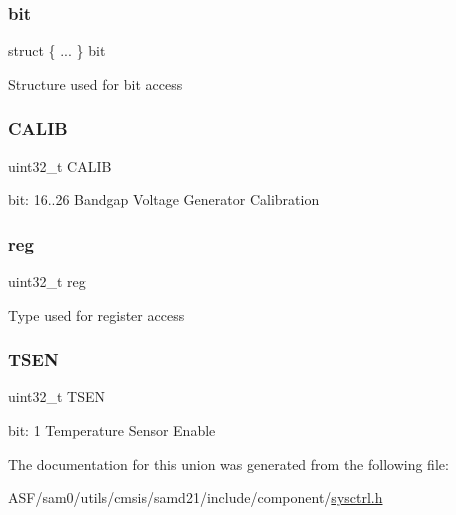 \subsubsection{\texorpdfstring{bit}{bit}}
{\footnotesize\ttfamily struct \{ ... \}   bit}

Structure used for bit access \mbox{\label{union_s_y_s_c_t_r_l___v_r_e_f___type_a95f06de3371ee421b89d4be2aae51561}} 
\subsubsection{\texorpdfstring{CALIB}{CALIB}}
{\footnotesize\ttfamily uint32\+\_\+t C\+A\+L\+IB}

bit\+: 16..26 Bandgap Voltage Generator Calibration \mbox{\label{union_s_y_s_c_t_r_l___v_r_e_f___type_a6b91636401516a477989a336376d7b40}} 
\subsubsection{\texorpdfstring{reg}{reg}}
{\footnotesize\ttfamily uint32\+\_\+t reg}

Type used for register access \mbox{\label{union_s_y_s_c_t_r_l___v_r_e_f___type_ac27e9f721252d5dd4b43ef11c3ec588c}} 
\subsubsection{\texorpdfstring{TSEN}{TSEN}}
{\footnotesize\ttfamily uint32\+\_\+t T\+S\+EN}

bit\+: 1 Temperature Sensor Enable 

The documentation for this union was generated from the following file\+:\begin{DoxyCompactItemize}
\item 
A\+S\+F/sam0/utils/cmsis/samd21/include/component/\mbox{\hyperlink{component_2sysctrl_8h}{sysctrl.\+h}}\end{DoxyCompactItemize}
